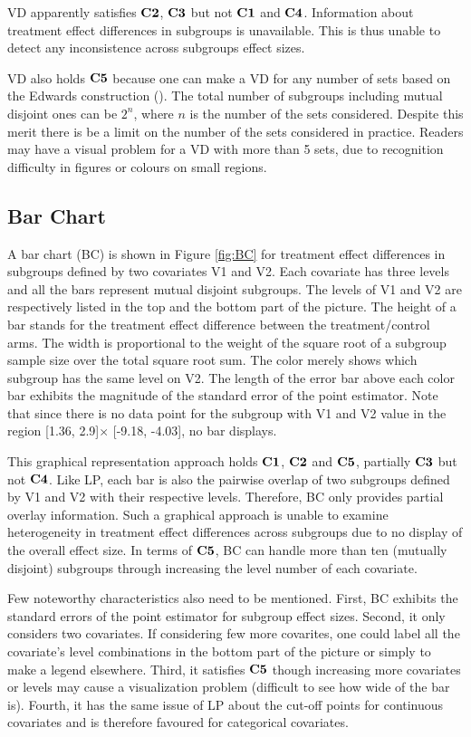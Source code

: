 \documentclass[Afour,sagev,times, doublespace]{sagej}
\begin{document}
{VD apparently satisfies $\bf C2$, $\bf C3$ but not $\bf C1$ and $\bf C4$. Information about treatment effect differences in subgroups is unavailable. This is thus unable to detect any inconsistence across subgroups effect sizes.

VD also holds $\bf C5$ because one can make a VD for any number of sets based on the Edwards construction (\cite{swinton:09,heberle:15}). The total number of subgroups including mutual disjoint ones can be $2^n$, where $n$ is the number of the sets considered. Despite this merit there is be a limit on the number of the sets considered in practice. Readers may have a visual problem for a VD with more than 5 sets,  due to recognition difficulty in figures or colours on small regions.


\subsection{Bar Chart}

A bar chart (BC) is shown in Figure \ref{fig:BC} for treatment effect differences in subgroups defined by two covariates V1 and V2. Each covariate has three levels and all the bars represent mutual disjoint subgroups. The levels of V1 and V2 are respectively listed in the top and the bottom part of the picture. The height of a bar stands for the treatment effect difference between the treatment/control arms. The width is proportional to the weight of the square root of a subgroup sample size over the total square root sum. The color merely shows which subgroup has the same level on V2. The length of the error bar above each color bar exhibits the magnitude of the standard error of the point estimator. Note that since there is no data point for the subgroup with V1 and V2 value in the region [1.36, 2.9]$\times$ [-9.18, -4.03], no bar displays.

This graphical representation approach holds $\bf C1$, $\bf C2$ and $\bf C5$, partially $\bf C3$ but not $\bf C4$. Like LP, each bar is also the pairwise overlap of two subgroups defined by V1 and V2 with their respective levels. Therefore, BC only provides partial overlay information. Such a graphical approach is unable to examine heterogeneity in treatment effect differences across subgroups due to no display of the overall effect size. In terms of $\bf C5$, BC can handle more than ten (mutually disjoint) subgroups through increasing the level number of each covariate.

Few noteworthy characteristics also need to be mentioned. First, BC exhibits the standard errors of the point estimator for subgroup effect sizes. Second, it only considers two covariates. If considering few more covarites, one could label all the covariate's level combinations in the bottom part of the picture or simply to make a legend elsewhere. Third, it satisfies $\bf C5$ though increasing more covariates or levels may cause a visualization problem (difficult to see how wide of the bar is). Fourth, it has the same issue of LP about the cut-off points for continuous covariates and is therefore favoured for categorical covariates.

}
\end{document}
